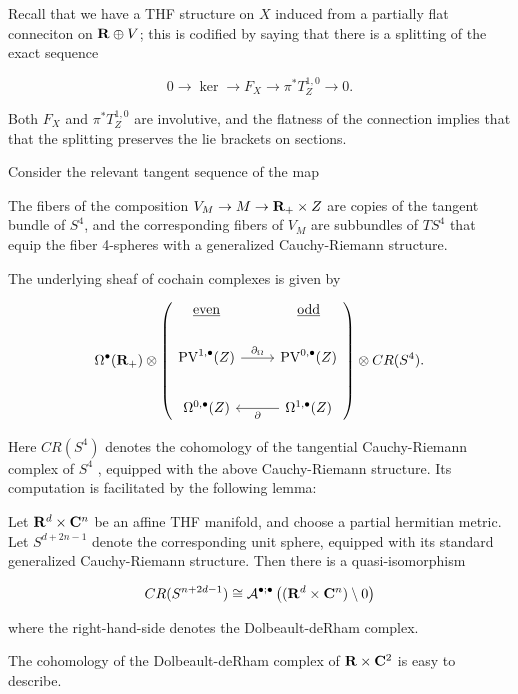 
Recall that we have a THF structure on $X$ induced from a partially flat conneciton on $\mathbf{R}\oplus V$; this is codified by saying that there is a splitting of the exact sequence

\[
0 \to \ker \to F_{X}\to \pi^{*}T^{1,0}_{Z}\to 0
.\]

Both $F_{X}$ and $\pi^{*}T^{1,0}_{Z}$ are involutive, and the flatness of the connection implies that that the splitting preserves the lie brackets on sections.

Consider the relevant tangent sequence of the map


The fibers of the composition $V_{M}\to M\to \mathbf{R}_{+}\times Z$ are copies of the tangent bundle of $S^{4}$, and the corresponding fibers of $V_{M}$ are subbundles of $TS^{4}$ that equip the fiber 4-spheres with a generalized Cauchy-Riemann structure. 

 The underlying sheaf of cochain complexes is given by

\[
\Omega^{\bullet}(\R_{+})\otimes \left ( \begin{tikzcd}
\ul{\rm even} & \ul{\rm odd} \\
\PV^{1,\bu}(Z) \ar[r, "\del_{\Omega}"] & \PV^{0,\bu}(Z)\\
\Omega^{0,\bu}(Z) & \Omega^{1,\bu}(Z) \ar[l, "\del"]
\end{tikzcd}
 \right ) \otimes CR (S^{4}).
\]


Here $CR (S^{4})$ denotes the cohomology of the tangential Cauchy-Riemann complex of $S^{4}$ , equipped with the above Cauchy-Riemann structure. Its computation is facilitated by the following lemma:

\begin{lem}
  Let $\mathbf{R}^{d}\times \mathbf{C}^{n}$ be an affine THF manifold, and choose a partial hermitian metric. Let $S^{d+2n-1}$ denote the corresponding unit sphere, equipped with its standard generalized Cauchy-Riemann structure. Then there is a quasi-isomorphism

  \[CR (S^{n+2d-1})\cong \mathcal A^{\bullet;\bullet}\left ( (\mathbf{R}^{d}\times \mathbf{C}^{n})\setminus 0 \right )\]

  where the right-hand-side denotes the Dolbeault-deRham complex.
\end{lem}

The cohomology of the Dolbeault-deRham complex of $\mathbf{R}\times \mathbf{C}^{2}$ is easy to describe.


